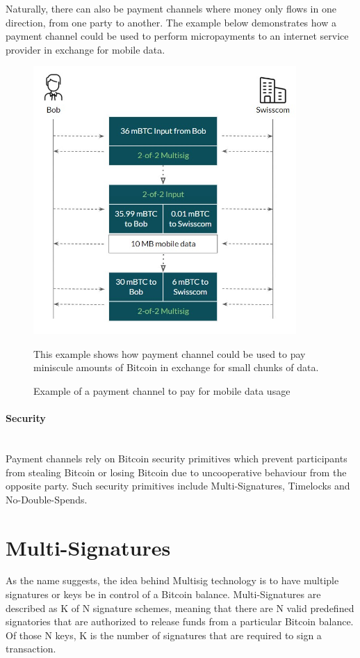 \documentclass[a4paper, 12pt]{report}
\begin{document}
\par Naturally, there can also be payment channels where money only flows in one direction, from one party to another. The example below demonstrates how a payment channel could be used to perform micropayments to an internet service provider in exchange for mobile data.

\begin{figure}[H]
	\centering
	\includegraphics[width=10cm]{07_Onedirectional_Channel}
	\caption{Example of a payment channel to pay for mobile data usage}
	\medskip
	\small This example shows how payment channel could be used to pay miniscule amounts of Bitcoin in exchange for small chunks of data.
	\label{fig:07_Onedirectional_Channel}
\end{figure}

\paragraph{Security} \hspace{0pt} \\
Payment channels rely on Bitcoin security primitives which prevent participants from stealing Bitcoin or losing Bitcoin due to uncooperative behaviour from the opposite party. Such security primitives include Multi-Signatures, Timelocks and No-Double-Spends.

\section{Multi-Signatures}

\par As the name suggests, the idea behind Multisig technology is to have multiple signatures or keys be in control of a Bitcoin balance. Multi-Signatures are described as K of N signature schemes, meaning that there are N valid predefined signatories that are authorized to release funds from a particular Bitcoin balance. Of those N keys, K is the number of signatures that are required to sign a transaction. \cite{inbook}
\end{document}
